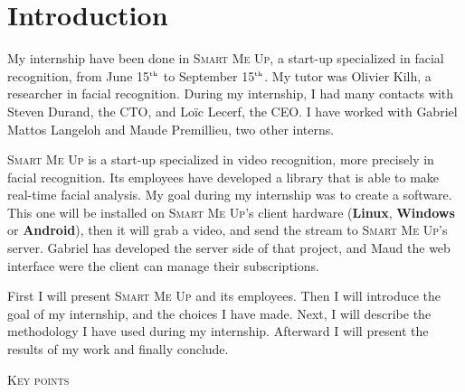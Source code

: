 \documentclass[a4paper,11pt]{custom}
\newcommand{\smu}{\textsc{Smart Me Up}\xspace}
\newcommand{\linux}{\textbf{Linux}\xspace}
\newcommand{\win}{\textbf{Windows}\xspace}
\newcommand{\android}{\textbf{Android}\xspace}
\newcommand{\nth}[1]{#1$^{\text{\tiny th}\xspace}$}
\begin{document}


\chapter{Introduction}

My internship have been done in \smu, a start-up specialized in facial
recognition, from June \nth{15} to September \nth{15}. My tutor was Olivier
Kilh, a researcher in facial recognition. During my internship, I had many
contacts with Steven Durand, the CTO, and Loïc Lecerf, the CEO. I have worked with
Gabriel Mattos Langeloh and Maude Premillieu, two other interns.

\smu{} is a start-up specialized in video recognition, more precisely in facial
recognition. Its employees have developed a library that is able to make
real-time facial analysis. My goal during my internship was to create a
software. This one will be installed on \smu's client hardware (\linux, \win{}
or \android), then it will grab a video, and send the stream to \smu's server.
Gabriel has developed the server side of that project, and Maud the web
interface were the client can manage their subscriptions.

First I will present \smu{} and its employees. Then I will introduce the goal of
my internship, and the choices I have made. Next, I will describe the
methodology I have used during my internship. Afterward I will present the
results of my work and finally conclude.

\vspace{\fill}

\begin{center}
\textsc{\textsc{Key points}}
\end{center}
\end{document}
